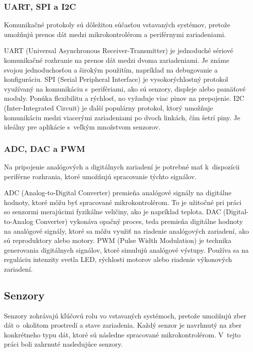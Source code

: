\subsubsection{UART, SPI a I2C}
Komunikačné protokoly sú dôležitou súčasťou vstavaných systémov, pretože umožňujú prenos dát medzi mikrokontrolérom a periférnymi zariadeniami.

UART (Universal Asynchronous Receiver-Transmitter) je jednoduché sériové komunikačné rozhranie na prenos dát medzi dvoma zariadeniami. 
Je známe svojou jednoduchosťou a širokým použitím, napríklad na debugovanie a konfiguráciu.
SPI (Serial Peripheral Interface) je vysokorýchlostný protokol využívaný na komunikáciu s~perifériami, ako sú senzory, displeje alebo pamäťové moduly.
Ponúka flexibilitu a rýchlosť, no vyžaduje viac pinov na prepojenie.
I2C (Inter-Integrated Circuit) je ďalší populárny protokol, ktorý umožňuje komunikáciu medzi viacerými zariadeniami po dvoch linkách, čím šetrí piny.
Je ideálny pre aplikácie s~veľkým množstvom senzorov.\cite{Horowitz}

\subsubsection{ADC, DAC a PWM}
Na pripojenie analógových a digitálnych zariadení je potrebné mať k~dispozícii periférne rozhrania, ktoré umožňujú spracovanie týchto signálov.

ADC (Analog-to-Digital Converter) premieňa analógové signály na digitálne hodnoty, ktoré môžu byť spracované mikrokontrolérom. 
To je užitočné pri práci so senzormi merajúcimi fyzikálne veličiny, ako je napríklad teplota. 
DAC (Digital-to-Analog Converter) vykonáva opačný proces, teda premieňa digitálne hodnoty na analógové signály, ktoré sa môžu využiť na riadenie analógových zariadení, ako sú reproduktory alebo motory. 
PWM (Pulse Width Modulation) je technika generovania digitálnych signálov, ktoré simulujú analógové výstupy. 
Používa sa na reguláciu intenzity svetla LED, rýchlosti motorov alebo riadenie výkonových zariadení.\cite{Horowitz}

\subsection{Senzory}
Senzory zohrávajú kľúčovú rolu vo vstavaných systémoch, pretože umožňujú zber dát o~okolitom prostredí a stave zariadenia.
Každý senzor je navrhnutý na zber konkrétneho typu dát, ktoré sú následne spracované mikrokontrolérom.
V~tejto práci boli zahrnuté nasledujúce senzory.

